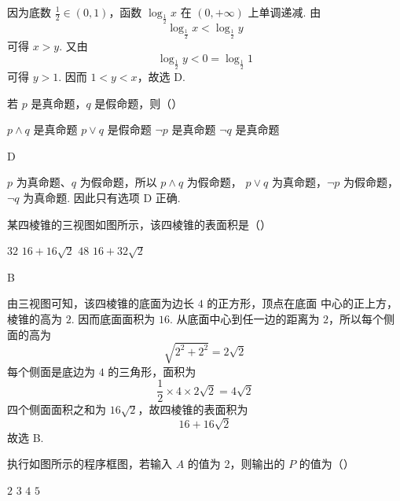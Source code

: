 \begin{solution}
因为底数 \(\frac{1}{2}\in(0,1)\)，函数
\(\log_{\frac{1}{2}}x\) 在 \((0,+\infty)\) 上单调递减.
由
\[
\log_{\frac{1}{2}}x<\log_{\frac{1}{2}}y
\]
可得 \(x>y\). 又由
\[
\log_{\frac{1}{2}}y<0=\log_{\frac{1}{2}}1
\]
可得 \(y>1\). 因而 \(1<y<x\)，故选 D.
\end{solution}

\begin{problem}
若 \(p\) 是真命题，\(q\) 是假命题，则（\quad）

\choices
    {\(p \wedge q\) 是真命题}
    {\(p \vee q\) 是假命题}
    {\(\neg p\) 是真命题}
    {\(\neg q\) 是真命题}
\end{problem}

\begin{answer}
D
\end{answer}

\begin{solution}
\(p\) 为真命题、\(q\) 为假命题，所以 \(p\wedge q\) 为假命题，
\(p\vee q\) 为真命题，\(\neg p\) 为假命题，\(\neg q\) 为真命题.
因此只有选项 D 正确.
\end{solution}

\begin{problem}
某四棱锥的三视图如图所示，该四棱锥的表面积是（\quad）


\choices
    {\(32\)}
    {\(16 + 16\sqrt{2}\)}
    {\(48\)}
    {\(16 + 32\sqrt{2}\)}
\end{problem}

\begin{answer}
B
\end{answer}

\begin{solution}
由三视图可知，该四棱锥的底面为边长 \(4\) 的正方形，顶点在底面
中心的正上方，棱锥的高为 \(2\). 因而底面面积为 \(16\).
从底面中心到任一边的距离为 \(2\)，所以每个侧面的高为
\[
\sqrt{2^{2}+2^{2}}=2\sqrt{2}
\]
每个侧面是底边为 \(4\) 的三角形，面积为
\[
\frac{1}{2}\times4\times2\sqrt{2}=4\sqrt{2}
\]
四个侧面面积之和为 \(16\sqrt{2}\)，故四棱锥的表面积为
\[
16+16\sqrt{2}
\]
故选 B.
\end{solution}

\begin{problem}
执行如图所示的程序框图，若输入 \(A\) 的值为 2，则输出的 \(P\) 的值为（\quad）


\choices
    {\(2\)}
    {\(3\)}
    {\(4\)}
    {\(5\)}
\end{problem}

